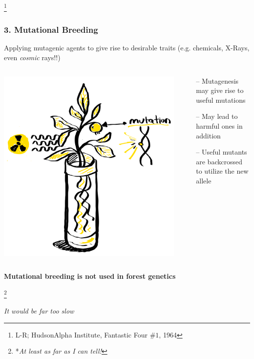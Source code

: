 \documentclass[xcolor=dvipsnames]{beamer}
\newcommand\blfootnote[1]{%
	\begingroup
	\renewcommand\thefootnote{}\footnote{#1}%
	\addtocounter{footnote}{-1}%
	\endgroup
}
\begin{document}
\begin{frame}
	
					\blfootnote{L-R; HudsonAlpha Institute, Fantastic Four $\#1$, 1964}
	
\end{frame}


\begin{frame}
	\frametitle{3. Mutational Breeding}
	Applying mutagenic agents to give rise to desirable traits (e.g. chemicals, X-Rays, even \textit{cosmic} rays!!)
	
	\begin{columns}
		\begin{column}{0.45\textwidth}
			\includegraphics[keepaspectratio, width  = \textwidth]{img/mutationBreeding}	
		\end{column}
		\begin{column}{0.55\textwidth}
		\begin{itemize}
			\item[--] Mutagenesis may give rise to useful mutations	
			\item[--] May lead to harmful ones in addition		
			\item[--] Useful mutants are backcrossed to utilize the new allele
		\end{itemize}			
		\end{column}

		
			\end{columns}
			\textbf{Mutational breeding is not used in forest genetics}
	
	\blfootnote{*\textit{At least as far as I can tell!}}
	\textit{It would be far too slow}
	
\end{frame}
\end{document}
